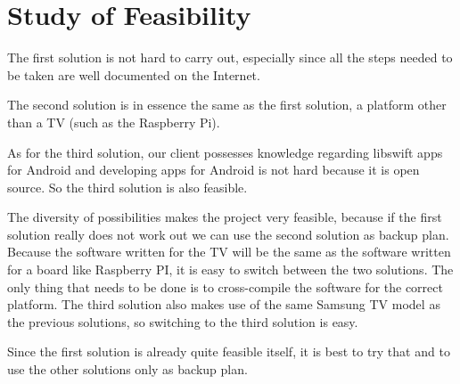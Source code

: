 \chapter*{Study of Feasibility}
The first solution is not hard to carry out, 
especially since all the steps needed to be taken are well documented on the Internet. 

The second solution is in essence the same as the first solution, a platform other than a TV (such as the Raspberry Pi). 

As for the third solution, 
our client possesses knowledge regarding libswift apps for Android and developing apps for Android is not hard 
because it is open source. So the third solution is also feasible.

The diversity of possibilities makes the project very feasible, 
because if the first solution really does not work out we can use the second solution as backup plan. 
Because the software written for the TV will be the same as the software written for a board like Raspberry PI, 
it is easy to switch between the two solutions. 
The only thing that needs to be done is to cross-compile the software for the correct platform. 
The third solution also makes use of the same Samsung TV model as the previous solutions, 
so switching to the third solution is easy. 

Since the first solution is already quite feasible itself, 
it is best to try that and to use the other solutions only as backup plan.
